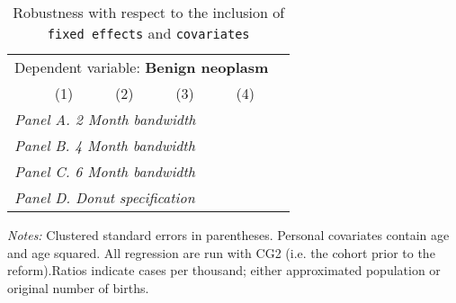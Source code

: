  \begin{table}[H] \begin{threeparttable} \centering \caption{Robustness with respect to the inclusion of \texttt{fixed effects} and \texttt{covariates}} {\def\sym#1{\ifmmode^{#1}\else\(^{#1}\)\fi} \begin{tabular}{l*{5}{c}} \toprule \multicolumn{5}{c}{Dependent variable: \textbf{Benign neoplasm}} \\ \cmidrule(lr){2-5}
            &\multicolumn{1}{c}{(1)}&\multicolumn{1}{c}{(2)}&\multicolumn{1}{c}{(3)}&\multicolumn{1}{c}{(4)}\\
\midrule
 \multicolumn{5}{l}{\emph{Panel A. 2 Month bandwidth}} \\    \midrule\multicolumn{5}{l}{\emph{Panel B. 4 Month bandwidth}} \\    \midrule\multicolumn{5}{l}{\emph{Panel C. 6 Month bandwidth}} \\    \midrule\multicolumn{5}{l}{\emph{Panel D. Donut specification}} \\    \midrule  
\bottomrule \end{tabular} } \begin{tablenotes} \item \scriptsize \emph{Notes:} Clustered standard errors in parentheses. Personal covariates contain age and age squared. All regression are run with CG2 (i.e. the cohort prior to the reform).Ratios indicate cases per thousand; either approximated population or original number of births. \end{tablenotes} \end{threeparttable} \end{table} 

